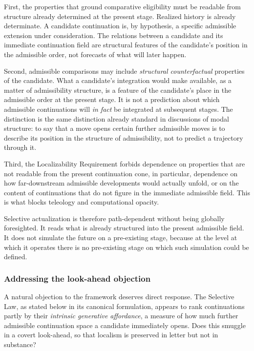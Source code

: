 \documentclass[11pt]{article}
\theoremstyle{foundation}
\begin{document}
First, the properties that ground comparative eligibility must be readable from structure already determined at the present stage. Realized history is already determinate. A candidate continuation is, by hypothesis, a specific admissible extension under consideration. The relations between a candidate and its immediate continuation field are structural features of the candidate's position in the admissible order, not forecasts of what will later happen.

Second, admissible comparisons may include \emph{structural counterfactual} properties of the candidate. What a candidate's integration would make available, as a matter of admissibility structure, is a feature of the candidate's place in the admissible order at the present stage. It is not a prediction about which admissible continuations will \emph{in fact} be integrated at subsequent stages. The distinction is the same distinction already standard in discussions of modal structure: to say that a move opens certain further admissible moves is to describe its position in the structure of admissibility, not to predict a trajectory through it.

Third, the Localizability Requirement forbids dependence on properties that are not readable from the present continuation cone, in particular, dependence on how far-downstream admissible developments would actually unfold, or on the content of continuations that do not figure in the immediate admissible field. This is what blocks teleology and computational opacity.

Selective actualization is therefore path-dependent without being globally foresighted. It reads what is already structured into the present admissible field. It does not simulate the future on a pre-existing stage, because at the level at which it operates there is no pre-existing stage on which such simulation could be defined.

\subsubsection{Addressing the look-ahead objection}

A natural objection to the framework deserves direct response. The Selective Law, as stated below in its canonical formulation, appears to rank continuations partly by their \emph{intrinsic generative affordance}, a measure of how much further admissible continuation space a candidate immediately opens. Does this smuggle in a covert look-ahead, so that localism is preserved in letter but not in substance?
\end{document}

